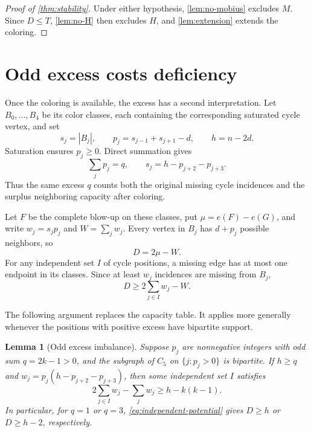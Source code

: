 \documentclass[11pt]{article}
\newtheorem{lemma}[theorem]{Lemma}
\theoremstyle{definition}
\theoremstyle{remark}
\begin{document}
\begin{proof}[Proof of \cref{thm:stability}]
Under either hypothesis, \cref{lem:no-mobius} excludes $M$.
Since $D\le T$, \cref{lem:no-H} then excludes $H$, and
\cref{lem:extension} extends the coloring.
\end{proof}

\section{Odd excess costs deficiency}\label{sec:capacity}

Once the coloring is available, the excess has a second interpretation.
Let $B_0,\ldots,B_4$ be its color classes, each containing the corresponding
saturated cycle vertex, and set
\[
  s_j=|B_j|,\qquad
  p_j=s_{j-1}+s_{j+1}-d,\qquad h=n-2d.
\]
Saturation ensures $p_j\ge0$. Direct summation gives
\begin{equation}\label{eq:potential-identities}
  \sum_jp_j=q,\qquad s_j=h-p_{j+2}-p_{j+3}.
\end{equation}
Thus the same excess $q$ counts both the original missing cycle incidences
and the surplus neighboring capacity after coloring.

Let $F$ be the complete blow-up on these classes, put
$\mu=e(F)-e(G)$, and write $w_j=s_jp_j$ and $W=\sum_jw_j$.
Every vertex in $B_j$ has $d+p_j$ possible neighbors, so
\begin{equation}\label{eq:missing-deficiency}
  D=2\mu-W.
\end{equation}
For any independent set $I$ of cycle positions, a missing edge has at most
one endpoint in its classes. Since at least $w_j$ incidences are missing
from $B_j$,
\begin{equation}\label{eq:independent-potential}
  D\ge2\sum_{j\in I}w_j-W.
\end{equation}

The following argument replaces the capacity table. It applies more
generally whenever the positions with positive excess have bipartite support.

\begin{lemma}[Odd excess imbalance]\label{lem:odd-excess}
Suppose $p_j$ are nonnegative integers with odd sum $q=2k-1>0$, and
the subgraph of $C_5$ on $\{j:p_j>0\}$ is bipartite. If $h\ge q$ and
$w_j=p_j(h-p_{j+2}-p_{j+3})$, then some independent set $I$ satisfies
\[
  2\sum_{j\in I}w_j-\sum_jw_j\ge h-k(k-1).
\]
In particular, for $q=1$ or $q=3$, \cref{eq:independent-potential} gives
$D\ge h$ or $D\ge h-2$, respectively.
\end{lemma}
\end{document}
